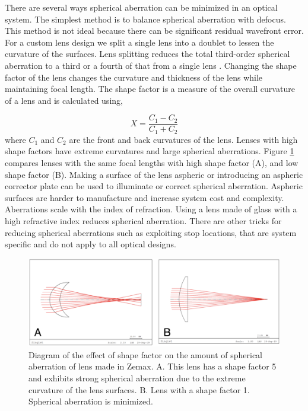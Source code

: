 There are several ways spherical aberration can be minimized in an optical system. The simplest method is to balance spherical aberration with defocus. This method is not ideal because there can be significant residual wavefront error. For a custom lens design  we split a single lens into a doublet to lessen the curvature of the surfaces. Lens splitting reduces the total third-order spherical aberration to a third or a fourth of that from a single lens \citep{sasianclass}. Changing the shape factor of the lens changes the curvature and thickness of the lens while maintaining focal length. The shape factor is a measure of the overall curvature of a lens and is calculated using,

\begin{equation}
    X=\frac{C_1-C_2}{C_1+C_2}
\end{equation}
\noindent where $C_1$ and $C_2$ are the front and back curvatures of the lens. Lenses with high shape factors have extreme curvatures and large spherical aberrations. Figure \ref{fig:shapefactor} compares lenses with the same focal lengths with high shape factor (A), and low shape factor (B). Making a surface of the lens aspheric or introducing an aspheric corrector plate can be used to illuminate or correct spherical aberration. Aspheric surfaces are harder to manufacture and increase system cost and complexity. Aberrations scale with the index of refraction. Using a lens made of glass with a high refractive index reduces spherical aberration. There are other tricks for reducing spherical aberrations such as exploiting stop locations, that are system specific and do not apply to all optical designs.  

\begin{figure}
    \centering
    \includegraphics[width=.8\textwidth]{Chapter Materials/Chapter Three Materials/ShapeFactor.png}
    \caption{ Diagram of the effect of shape factor on the amount of spherical aberration of lens made in Zemax. A. This lens has a shape factor 5 and exhibits strong spherical aberration due to the extreme curvature of the lens surfaces. B. Lens with a shape factor 1. Spherical aberration is minimized.}
    \label{fig:shapefactor}
\end{figure}


